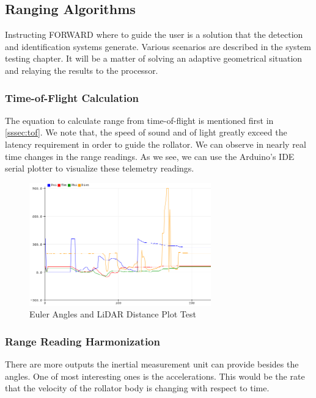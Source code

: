 \subsection{Ranging Algorithms}
\noindent Instructing FORWARD where to guide the user is a solution that the detection and identification systems generate. Various scenarios are described in the system testing chapter. It will be a matter of solving an adaptive geometrical situation and relaying the results to the processor.\\

\subsubsection{Time-of-Flight Calculation}
\noindent The equation to calculate range from time-of-flight is mentioned first in \ref{sssec:tof}. We note that, the speed of sound and of light greatly exceed the latency requirement in order to guide the rollator. We can observe in nearly real time changes in the range readings. As we see, we can use the Arduino's IDE serial plotter to visualize these telemetry readings.\\

\begin{figure}[H]
	\centering
	\includegraphics[width=0.7\textwidth]{./Images/serial-plotter.png}
	\caption{\label{fig:serial-plot}Euler Angles and LiDAR Distance Plot Test}
\end{figure}

\subsubsection{Range Reading Harmonization}
\noindent There are more outputs the inertial measurement unit can provide besides the angles. One of most interesting ones is the accelerations. This would be the rate that the velocity of the rollator body is changing with respect to time. 

